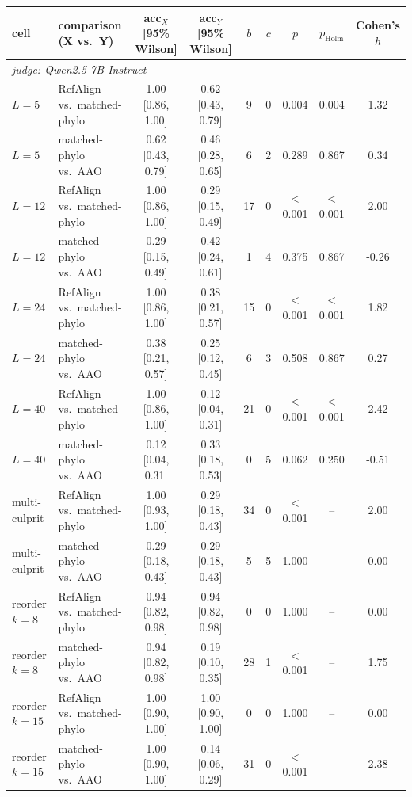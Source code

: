 \begin{table}[t]
\centering\scriptsize
\begin{tabular}{llccccccc}
\toprule
cell & comparison (X vs.\ Y) & acc$_X$ [95\% Wilson] & acc$_Y$ [95\% Wilson] & $b$ & $c$ & $p$ & $p_{\mathrm{Holm}}$ & Cohen's $h$ \\
\midrule
\multicolumn{9}{l}{\emph{judge: Qwen2.5-7B-Instruct}} \\
$L{=}5$ & RefAlign vs.\ matched-phylo & 1.00 [0.86, 1.00] & 0.62 [0.43, 0.79] & 9 & 0 & 0.004 & 0.004 & 1.32 \\
$L{=}5$ & matched-phylo vs.\ AAO & 0.62 [0.43, 0.79] & 0.46 [0.28, 0.65] & 6 & 2 & 0.289 & 0.867 & 0.34 \\
$L{=}12$ & RefAlign vs.\ matched-phylo & 1.00 [0.86, 1.00] & 0.29 [0.15, 0.49] & 17 & 0 & $<$0.001 & $<$0.001 & 2.00 \\
$L{=}12$ & matched-phylo vs.\ AAO & 0.29 [0.15, 0.49] & 0.42 [0.24, 0.61] & 1 & 4 & 0.375 & 0.867 & -0.26 \\
$L{=}24$ & RefAlign vs.\ matched-phylo & 1.00 [0.86, 1.00] & 0.38 [0.21, 0.57] & 15 & 0 & $<$0.001 & $<$0.001 & 1.82 \\
$L{=}24$ & matched-phylo vs.\ AAO & 0.38 [0.21, 0.57] & 0.25 [0.12, 0.45] & 6 & 3 & 0.508 & 0.867 & 0.27 \\
$L{=}40$ & RefAlign vs.\ matched-phylo & 1.00 [0.86, 1.00] & 0.12 [0.04, 0.31] & 21 & 0 & $<$0.001 & $<$0.001 & 2.42 \\
$L{=}40$ & matched-phylo vs.\ AAO & 0.12 [0.04, 0.31] & 0.33 [0.18, 0.53] & 0 & 5 & 0.062 & 0.250 & -0.51 \\
multi-culprit & RefAlign vs.\ matched-phylo & 1.00 [0.93, 1.00] & 0.29 [0.18, 0.43] & 34 & 0 & $<$0.001 & -- & 2.00 \\
multi-culprit & matched-phylo vs.\ AAO & 0.29 [0.18, 0.43] & 0.29 [0.18, 0.43] & 5 & 5 & 1.000 & -- & 0.00 \\
reorder $k{=}8$ & RefAlign vs.\ matched-phylo & 0.94 [0.82, 0.98] & 0.94 [0.82, 0.98] & 0 & 0 & 1.000 & -- & 0.00 \\
reorder $k{=}8$ & matched-phylo vs.\ AAO & 0.94 [0.82, 0.98] & 0.19 [0.10, 0.35] & 28 & 1 & $<$0.001 & -- & 1.75 \\
reorder $k{=}15$ & RefAlign vs.\ matched-phylo & 1.00 [0.90, 1.00] & 1.00 [0.90, 1.00] & 0 & 0 & 1.000 & -- & 0.00 \\
reorder $k{=}15$ & matched-phylo vs.\ AAO & 1.00 [0.90, 1.00] & 0.14 [0.06, 0.29] & 31 & 0 & $<$0.001 & -- & 2.38 \\

\end{tabular}
\end{table}

